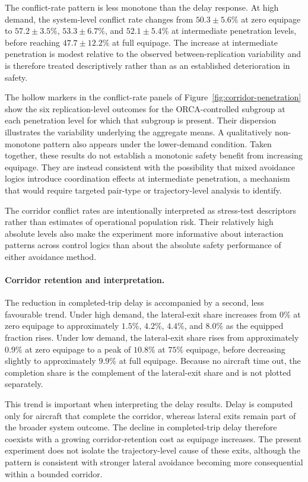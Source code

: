 \documentclass[11pt]{article}
\theoremstyle{plain}
\theoremstyle{definition}
\begin{document}
The conflict-rate pattern is less monotone than the delay response.
At high demand, the system-level conflict rate changes from
$50.3\pm5.6\%$ at zero equipage to
$57.2\pm3.5\%$, $53.3\pm6.7\%$, and
$52.1\pm5.4\%$ at intermediate penetration levels, before reaching
$47.7\pm12.2\%$ at full equipage. The increase at intermediate
penetration is modest relative to the observed between-replication
variability and is therefore treated descriptively rather than as an
established deterioration in safety.

The hollow markers in the conflict-rate panels of
Figure~\ref{fig:corridor-penetration} show the six
replication-level outcomes for the ORCA-controlled subgroup at each
penetration level for which that subgroup is present. Their dispersion
illustrates the variability underlying the aggregate means. A
qualitatively non-monotone pattern also appears under the lower-demand
condition. Taken together, these results do not establish a monotonic
safety benefit from increasing equipage. They are instead consistent
with the possibility that mixed avoidance logics introduce
coordination effects at intermediate penetration, a mechanism that
would require targeted pair-type or trajectory-level analysis to
identify.

The corridor conflict rates are intentionally interpreted as
stress-test descriptors rather than estimates of operational
population risk. Their relatively high absolute levels also make the
experiment more informative about interaction patterns across control
logics than about the absolute safety performance of either avoidance
method.

\paragraph{Corridor retention and interpretation.}

The reduction in completed-trip delay is accompanied by a second,
less favourable trend. Under high demand, the lateral-exit share
increases from $0\%$ at zero equipage to approximately
$1.5\%$, $4.2\%$, $4.4\%$, and $8.0\%$ as the equipped
fraction rises. Under low demand, the lateral-exit share rises from approximately
$0.9\%$ at zero equipage to a peak of $10.8\%$ at $75\%$ equipage,
before decreasing slightly to approximately $9.9\%$ at full equipage. Because no
aircraft time out, the completion share is the complement of the
lateral-exit share and is not plotted separately.

This trend is important when interpreting the delay results. Delay is
computed only for aircraft that complete the corridor, whereas
lateral exits remain part of the broader system outcome. The decline
in completed-trip delay therefore coexists with a growing
corridor-retention cost as equipage increases. The present experiment
does not isolate the trajectory-level cause of these exits, although
the pattern is consistent with stronger lateral avoidance becoming
more consequential within a bounded corridor.
\end{document}
